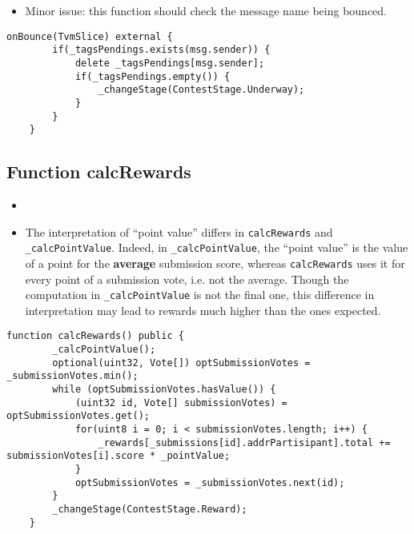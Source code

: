 \begin{itemize}
\item Minor issue: this function should check the message name being
  bounced.
\end{itemize}

\begin{lstlisting}[firstnumber=64]
    onBounce(TvmSlice) external {
        if(_tagsPendings.exists(msg.sender)) {
            delete _tagsPendings[msg.sender];
            if(_tagsPendings.empty()) {
                _changeStage(ContestStage.Underway);
            }
        }
    }
\end{lstlisting}

\subsection{Function calcRewards}

\begin{itemize}
\item {}
\item {} {The
  interpretation of ``point value'' differs in {\tt calcRewards} and
  {\tt \_calcPointValue}. Indeed, in {\tt \_calcPointValue}, the
  ``point value'' is the value of a point for the {\bf average}
  submission score, whereas {\tt calcRewards} uses it for every point
  of a submission vote, i.e. not the average. Though the computation
  in {\tt \_calcPointValue} is not the final one, this difference in
  interpretation may lead to rewards much higher than the ones
  expected.}
\end{itemize}

\begin{lstlisting}[firstnumber=175]
    function calcRewards() public {
        _calcPointValue();
        optional(uint32, Vote[]) optSubmissionVotes = _submissionVotes.min();
        while (optSubmissionVotes.hasValue()) {
            (uint32 id, Vote[] submissionVotes) = optSubmissionVotes.get();
            for(uint8 i = 0; i < submissionVotes.length; i++) {
                _rewards[_submissions[id].addrPartisipant].total += submissionVotes[i].score * _pointValue;
            }
            optSubmissionVotes = _submissionVotes.next(id);
        }
        _changeStage(ContestStage.Reward);
    }
\end{lstlisting}


